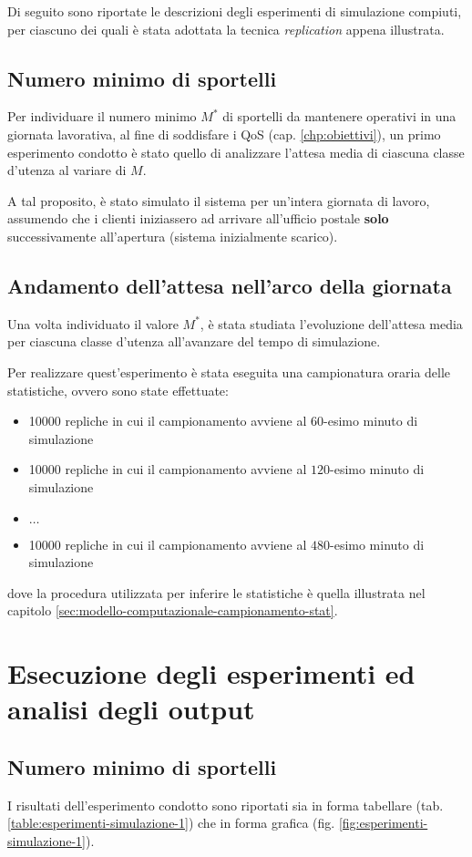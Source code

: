 Di seguito sono riportate le descrizioni degli esperimenti di simulazione compiuti, per ciascuno dei quali è stata adottata la tecnica \textit{replication} appena illustrata.

\subsection*{Numero minimo di sportelli}
Per individuare il numero minimo $M^*$ di sportelli da mantenere operativi in una giornata lavorativa, al fine di soddisfare i QoS (cap. \ref{chp:obiettivi}), un primo esperimento condotto è stato quello di analizzare l'attesa media di ciascuna classe d'utenza al variare di $M$.

A tal proposito, è stato simulato il sistema per un'intera giornata di lavoro, assumendo che i clienti iniziassero ad arrivare all'ufficio postale \textbf{solo} successivamente all'apertura (sistema inizialmente scarico).

\subsection*{Andamento dell'attesa nell'arco della giornata}
Una volta individuato il valore $M^*$, è stata studiata l'evoluzione dell'attesa media per ciascuna classe d'utenza all'avanzare del tempo di simulazione.

Per realizzare quest'esperimento è stata eseguita una campionatura oraria delle statistiche, ovvero sono state effettuate:
\begin{itemize}
\item 10000 repliche in cui il campionamento avviene al $60$-esimo minuto di simulazione
\item 10000 repliche in cui il campionamento avviene al $120$-esimo minuto di simulazione
\item $\dots$
\item 10000 repliche in cui il campionamento avviene al $480$-esimo minuto di simulazione
\end{itemize}
dove la procedura utilizzata per inferire le statistiche è quella illustrata nel capitolo \ref{sec:modello-computazionale-campionamento-stat}.
	
\section{Esecuzione degli esperimenti ed analisi degli output}
\subsection*{Numero minimo di sportelli}
I risultati dell'esperimento condotto sono riportati sia in forma tabellare (tab. \ref{table:esperimenti-simulazione-1}) che in forma grafica (fig. \ref{fig:esperimenti-simulazione-1}).

